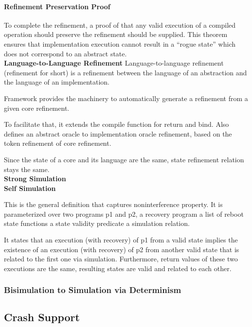 \documentclass[onecolumn]{paper}
\begin{document}
		\paragraph{Refinement Preservation Proof}
		To complete the refinement, a proof of that any valid execution of a compiled operation should preserve the refinement should be supplied. This theorem ensures that implementation execution cannot result in a “rogue state” which does not correspond to an abstract state.\\
		
		{\bf Language-to-Language Refinement}
		Language-to-language refinement (refinement for short) is a refinement between the language of an abstraction and the language of an implementation.
		
		Framework provides the machinery to automatically generate a refinement from a given core refinement.
		
		To facilitate that, it extends the compile function for return and bind. 
		Also defines an abstract oracle to implementation oracle refinement, based on the token refinement of core refinement. 
		
		Since the state of a core and its language are the same, state refinement relation stays the same.\\
		
		
		{\bf Strong Simulation}\\
		
		
		{\bf Self Simulation}
		
		This is the general definition that captures noninterference property.
		It is parameterized over 
		two programs p1 and p2, 
		a recovery program
		a list of reboot state functions
		a state validity predicate
		a simulation relation.
		
		It states that an execution (with recovery) of p1 from a valid state implies the existence of an execution (with recovery) of p2 from another valid state that is related to the first one via simulation. Furthermore, return values of these two executions are the same, resulting states are valid and related to each other.
		
		
		\subsubsection{Bisimulation to Simulation via Determinism}
		
		

	\subsection{Crash Support}
\end{document}
